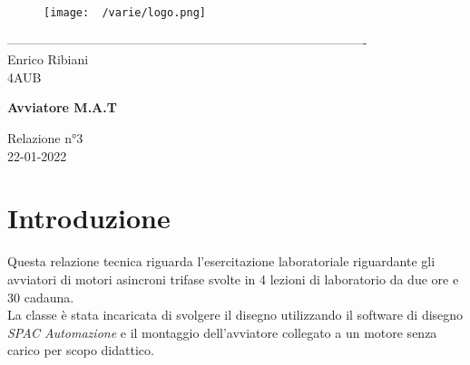 \documentclass[12pt]{article}
\begin{document}
    \begin{titlepage}
    \begin{center}
\begin{figure}
    \centering
    \texttt{[image: ~/varie/logo.png]}
    \label{fig:logo}
\end{figure}
-------------------------------------------------------------------------------------\\
\vspace{2\baselineskip}
\large Enrico Ribiani\\
\large 4AUB\\
\vfill

\Huge{\textbf{Avviatore M.A.T}}\\
\vfill

\LARGE{Relazione n°3}\\
\vfill
\large{22-01-2022}
\end{center}
\end{titlepage}
\tableofcontents
\vskip 1cm
\section{Introduzione}
Questa relazione tecnica riguarda l'esercitazione laboratoriale riguardante gli avviatori di motori asincroni trifase svolte in  4 lezioni di laboratorio da due ore e 30 cadauna.\\
La classe è stata incaricata di svolgere il disegno utilizzando il software di disegno \textit{SPAC Automazione} e il montaggio dell'avviatore collegato a un motore senza carico per scopo didattico.\\
\end{document}
